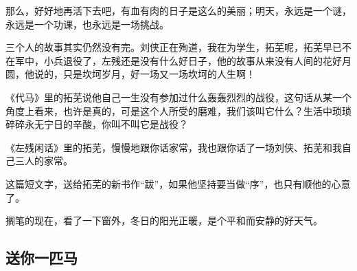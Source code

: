\par 那么，好好地再活下去吧，有血有肉的日子是这么的美丽；明天，永远是一个谜，永远是一个功课，也永远是一场挑战。
\par 三个人的故事其实仍然没有完。刘侠正在殉道，我在为学生，拓芜呢，拓芜早已不在军中，小兵退役了，左残还是没有什么好日子，他的故事从来没有人间的花好月圆，他说的，只是坎坷岁月，好一场又一场坎坷的人生啊！
\par 《代马》里的拓芜说他自己一生没有参加过什么轰轰烈烈的战役，这句话从某一个角度上看来，也许是真的，可是这个人所受的磨难，我们该叫它什么？生活中琐琐碎碎永无宁日的辛酸，你叫不叫它是战役？
\par 《左残闲话》里的拓芜，慢慢地跟你话家常，我也跟你话了一场刘侠、拓芜和我自己三人的家常。
\par 这篇短文字，送给拓芜的新书作“跋”，如果他坚持要当做“序”，也只有顺他的心意了。
\par 搁笔的现在，看了一下窗外，冬日的阳光正暖，是个平和而安静的好天气。


\subsection{送你一匹马}

